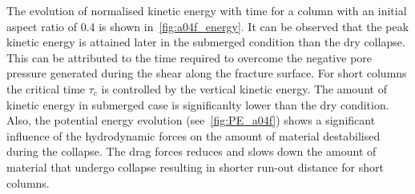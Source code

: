 The evolution of normalised kinetic energy with time for a column with an 
initial aspect ratio of 0.4 is shown in~\cref{fig:a04f_energy}. It can be 
observed that the peak kinetic energy is attained later in the submerged 
condition than the dry collapse. This can be attributed to the time required to 
overcome the negative pore pressure generated during the shear along the 
fracture surface. For short columns the critical time $\tau_c$ is controlled by 
the vertical kinetic energy. The amount of kinetic energy in submerged case is 
significanlty lower than the dry condition. Also, the potential energy 
evolution (see~\cref{fig:PE_a04f}) shows a significant influence of the 
hydrodynamic forces on the amount of material destabilised during the collapse. 
The drag forces reduces and slows down the amount of material that undergo 
collapse resulting in shorter run-out distance for short columns. 
